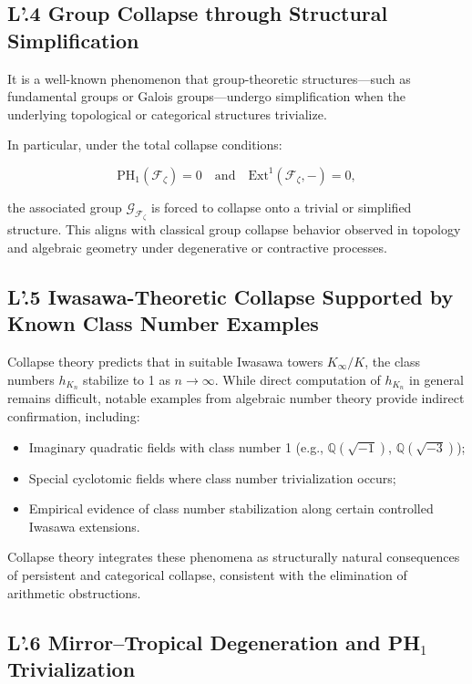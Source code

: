 \documentclass[11pt]{article}
\begin{document}
\subsection*{L'.4 Group Collapse through Structural Simplification}

It is a well-known phenomenon that group-theoretic structures—such as fundamental groups or Galois groups—undergo simplification when the underlying topological or categorical structures trivialize.

In particular, under the total collapse conditions:

\[
\mathrm{PH}_1(\mathcal{F}_{\zeta}) = 0 \quad \text{and} \quad \mathrm{Ext}^1(\mathcal{F}_{\zeta}, -) = 0,
\]

the associated group $\mathcal{G}_{\mathcal{F}_{\zeta}}$ is forced to collapse onto a trivial or simplified structure. This aligns with classical group collapse behavior observed in topology and algebraic geometry under degenerative or contractive processes.

\subsection*{L'.5 Iwasawa-Theoretic Collapse Supported by Known Class Number Examples}

Collapse theory predicts that in suitable Iwasawa towers $K_\infty / K$, the class numbers $h_{K_n}$ stabilize to 1 as $n \to \infty$. While direct computation of $h_{K_n}$ in general remains difficult, notable examples from algebraic number theory provide indirect confirmation, including:

\begin{itemize}
    \item Imaginary quadratic fields with class number 1 (e.g., $\mathbb{Q}(\sqrt{-1})$, $\mathbb{Q}(\sqrt{-3})$);
    \item Special cyclotomic fields where class number trivialization occurs;
    \item Empirical evidence of class number stabilization along certain controlled Iwasawa extensions.
\end{itemize}

Collapse theory integrates these phenomena as structurally natural consequences of persistent and categorical collapse, consistent with the elimination of arithmetic obstructions.

\subsection*{L'.6 Mirror–Tropical Degeneration and PH$_1$ Trivialization}
\end{document}
